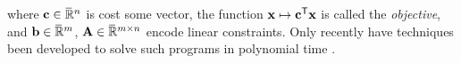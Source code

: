\documentclass{article}
\begin{document}
where $\mathbf{c} \in \mskip1mu\overline{\mskip-1mu\mathbb R\!}\,^{n}$ is cost some vector,
the function $\mathbf{x} \mapsto \mathbf{c}^{\sf T} \mathbf{x}$ is called the \emph{objective},
and $\mathbf{b} \in \mskip1mu\overline{\mskip-1mu\mathbb R\!}\,^m$, $\mathbf{A} \in \mskip1mu\overline{\mskip-1mu\mathbb R\!}\,^{m \times n}$ encode linear constraints.
%
{\color{red} Only recently} have techniques
 been developed to solve such programs in polynomial time \parencite{badenbroek2021algorithm,dahl2022primal}.
\end{document}
